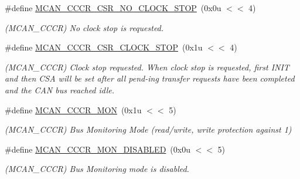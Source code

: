 \begin{DoxyCompactItemize}
\mbox{\label{group__SAME70__MCAN_ga1092f4e28b8c42009cb93b0ee1058f03}} 
\#define \mbox{\hyperlink{group__SAME70__MCAN_ga1092f4e28b8c42009cb93b0ee1058f03}{M\+C\+A\+N\+\_\+\+C\+C\+C\+R\+\_\+\+C\+S\+R\+\_\+\+N\+O\+\_\+\+C\+L\+O\+C\+K\+\_\+\+S\+T\+OP}}~(0x0u $<$$<$ 4)
\begin{DoxyCompactList}\small\item\em (M\+C\+A\+N\+\_\+\+C\+C\+CR) No clock stop is requested. \end{DoxyCompactList}\item 
\mbox{\label{group__SAME70__MCAN_ga9e1cbd145ee1f26f7cedd433de662af4}} 
\#define \mbox{\hyperlink{group__SAME70__MCAN_ga9e1cbd145ee1f26f7cedd433de662af4}{M\+C\+A\+N\+\_\+\+C\+C\+C\+R\+\_\+\+C\+S\+R\+\_\+\+C\+L\+O\+C\+K\+\_\+\+S\+T\+OP}}~(0x1u $<$$<$ 4)
\begin{DoxyCompactList}\small\item\em (M\+C\+A\+N\+\_\+\+C\+C\+CR) Clock stop requested. When clock stop is requested, first I\+N\+IT and then C\+SA will be set after all pend-\/ing transfer requests have been completed and the C\+AN bus reached idle. \end{DoxyCompactList}\item 
\mbox{\label{group__SAME70__MCAN_gaec6ca600990408fc9dad40f6656ea8d3}} 
\#define \mbox{\hyperlink{group__SAME70__MCAN_gaec6ca600990408fc9dad40f6656ea8d3}{M\+C\+A\+N\+\_\+\+C\+C\+C\+R\+\_\+\+M\+ON}}~(0x1u $<$$<$ 5)
\begin{DoxyCompactList}\small\item\em (M\+C\+A\+N\+\_\+\+C\+C\+CR) Bus Monitoring Mode (read/write, write protection against \textquotesingle{}1\textquotesingle{}) \end{DoxyCompactList}\item 
\mbox{\label{group__SAME70__MCAN_ga69c46d7fbface6c5a52bad8bedfb0e65}} 
\#define \mbox{\hyperlink{group__SAME70__MCAN_ga69c46d7fbface6c5a52bad8bedfb0e65}{M\+C\+A\+N\+\_\+\+C\+C\+C\+R\+\_\+\+M\+O\+N\+\_\+\+D\+I\+S\+A\+B\+L\+ED}}~(0x0u $<$$<$ 5)
\begin{DoxyCompactList}\small\item\em (M\+C\+A\+N\+\_\+\+C\+C\+CR) Bus Monitoring mode is disabled. \end{DoxyCompactList}\item 

\end{DoxyCompactItemize}
